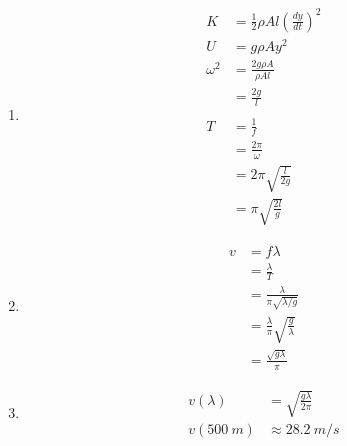\documentclass{article}
\begin{document}
\begin{enumerate}
  \item

        \begin{align*}
          K        & = \frac{1}{2} \rho A l \left( \frac{d y}{d t} \right)^2 \\
          U        & = g \rho A y^2                                          \\
          \omega^2 & = \frac{2 g \rho A}{\rho A l}                           \\
                   & = \frac{2 g}{l}                                         \\ \\
          T        & = \frac{1}{f}                                           \\
                   & = \frac{2 \pi}{\omega}                                  \\
                   & = 2 \pi \sqrt{\frac{l}{2 g}}                            \\
                   & = \pi \sqrt{\frac{2 l}{g}}
        \end{align*}

  \item

        \begin{align*}
          v & = f \lambda                                    \\
            & = \frac{\lambda}{T}                            \\
            & = \frac{\lambda}{\pi \sqrt{\lambda / g}}       \\
            & = \frac{\lambda}{\pi} \sqrt{\frac{g}{\lambda}} \\
            & = \frac{\sqrt{g \lambda}}{\pi}
        \end{align*}

  \item

        \begin{align*}
          v(\lambda)      & = \sqrt{\frac{g \lambda}{2 \pi}} \\
          v(\qty{500}{m}) & \approx \qty{28.2}{m/s}
        \end{align*}
\end{enumerate}

\subsection{}
\end{document}
